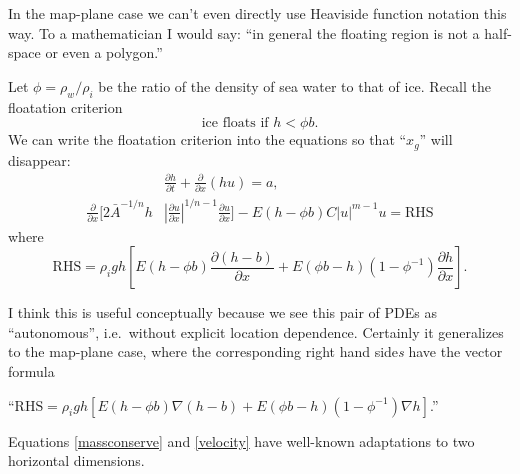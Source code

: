 \documentclass[11pt,final]{amsart}
\newcommand{\ddt}[1]{\ensuremath{\frac{\partial #1}{\partial t}}}
\newcommand{\ddx}[1]{\ensuremath{\frac{\partial #1}{\partial x}}}
\newcommand{\grad}{\nabla}
\begin{document}
In the map-plane case we can't even directly use Heaviside function notation this way.  To a mathematician I would say: ``in general the floating region is not a half-space or even a polygon.''

Let $\phi = \rho_w/\rho_i$ be the ratio of the density of sea water to that of ice.  Recall the floatation criterion
	$$\text{ice floats if } h < \phi b.$$
We can write the floatation criterion into the equations so that ``$x_g$'' will disappear:
\begin{align}
&\ddt{h} + \ddx{}\left(h u\right) = a, \label{massconserve} \\
\ddx{}\Big[2 {\bar A}^{-1/n} h &\left|\ddx{u}\right|^{1/n-1} \ddx{u}\Big] - E(h - \phi b) C|u|^{m-1} u = \text{RHS} \label{velocity}
\end{align}
where
	$$\text{RHS} = \rho_i g h \left[E(h - \phi b) \ddx{(h-b)} + E(\phi b - h) (1-\phi^{-1}) \ddx{h}\right].$$

I think this is useful conceptually because we see this pair of PDEs as ``autonomous'', i.e.~without explicit location dependence.  Certainly it generalizes to the map-plane case, where the corresponding right hand side\emph{s} have the vector formula

	\centerline{``$\text{RHS} = \rho_i g h \left[E(h - \phi b) \grad(h-b) + E(\phi b - h) (1-\phi^{-1}) \grad h\right]$.''}
\noindent Equations \eqref{massconserve} and \eqref{velocity} have well-known adaptations to two horizontal dimensions.



\end{document}
